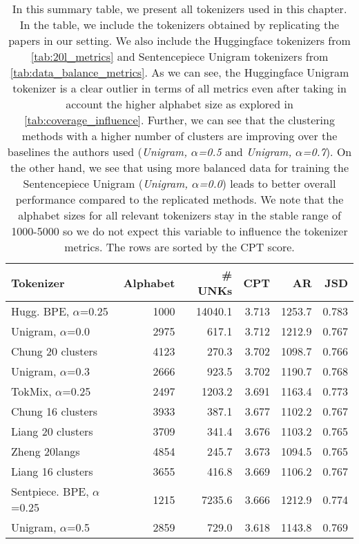 \begin{table}
\caption{In this summary table, we present all tokenizers used in this chapter. In the table, we include the tokenizers obtained by replicating the papers \citet{chung_improving_2020,zheng_allocating_2021,liang_xlm-v_2023} in our setting. We also include the Huggingface tokenizers from \autoref{tab:20l_metrics} and Sentencepiece Unigram tokenizers from \autoref{tab:data_balance_metrics}. As we can see, the Huggingface Unigram tokenizer is a clear outlier in terms of all metrics even after taking in account the higher alphabet size as explored in \autoref{tab:coverage_influence}. Further, we can see that the clustering methods with a higher number of clusters are improving over the baselines the authors used (\textit{Unigram, $\alpha$=0.5} and \textit{Unigram, $\alpha$=0.7}). On the other hand, we see that using more balanced data for training the Sentencepiece Unigram (\textit{Unigram, $\alpha$=0.0}) leads to better overall performance compared to the replicated methods. We note that the alphabet sizes for all relevant tokenizers stay in the stable range of 1000-5000 so we do not expect this variable to influence the tokenizer metrics. The rows are sorted by the CPT score.}
\label{tab:all_tokenizers_metrics}
\begin{tabular}{lrrrrr}
\toprule
Tokenizer & Alphabet & \# UNKs & CPT & AR & JSD \\
\midrule
Hugg. BPE, $\alpha$=0.25 & 1000 & 14040.1 & 3.713 & 1253.7 & 0.783 \\
Unigram, $\alpha$=0.0 & 2975 & 617.1 & 3.712 & 1212.9 & 0.767 \\
Chung 20 clusters & 4123 & 270.3 & 3.702 & 1098.7 & 0.766 \\
Unigram, $\alpha$=0.3 & 2666 & 923.5 & 3.702 & 1190.7 & 0.768 \\
TokMix, $\alpha$=0.25 & 2497 & 1203.2 & 3.691 & 1163.4 & 0.773 \\
Chung 16 clusters & 3933 & 387.1 & 3.677 & 1102.2 & 0.767 \\
Liang 20 clusters & 3709 & 341.4 & 3.676 & 1103.2 & 0.765 \\
Zheng 20langs & 4854 & 245.7 & 3.673 & 1094.5 & 0.765 \\
Liang 16 clusters & 3655 & 416.8 & 3.669 & 1106.2 & 0.767 \\
Sentpiece. BPE, $\alpha$=0.25 & 1215 & 7235.6 & 3.666 & 1212.9 & 0.774 \\
Unigram, $\alpha$=0.5 & 2859 & 729.0 & 3.618 & 1143.8 & 0.769 \\

\end{tabular}
\end{table}
